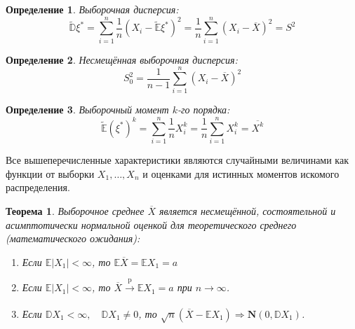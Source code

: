 \documentclass[oneside,final,14pt]{extreport}
\newtheorem{thm}{Теорема}[section]
\theoremstyle{definition}
\newtheorem{defn}{Определение}[section]
\begin{document}
\begin{defn}
{\it Выборочная дисперсия:}
\begin{equation*}
    \tilde{\mathbb{D}} \xi^{*}=\sum_{i=1}^{n} \frac{1}{n}(X_{i}-\tilde{\mathbb{E}} \xi^{*})^{2}=\frac{1}{n} \sum_{i=1}^{n}(X_{i}-\overline{X})^{2}=S^{2}
\end{equation*}
\end{defn}

\begin{defn}
{\it Несмещённая выборочная дисперсия:} 
\begin{equation*}
    S_{0}^{2}=\frac{1}{n-1} \sum_{i=1}^{n}\left(X_{i}-\overline{X}\right)^{2}
\end{equation*}
\end{defn}

\begin{defn}
{\it Выборочный момент $k$-го порядка:}
\begin{equation*}
    \tilde{\mathbb{E}}(\xi^{*})^{k}=\sum_{i=1}^{n} \frac{1}{n} X_{i}^{k}=\frac{1}{n} \sum_{i=1}^{n} X_{i}^{k}=\overline{X^{k}}
\end{equation*}
\end{defn}

Все вышеперечисленные характеристики являются случайными величинами как функции от выборки $X_{1}, \ldots, X_{n}$ и оценками для истинных моментов искомого распределения.

\begin{thm}
Выборочное среднее $\overline{X}$ является несмещённой, состоятельной и асимптотически нормальной оценкой для теоретического среднего (математического ожидания):

\begin{enumerate}[label={\arabic*.}]
    \item Если $\mathbb{E}|X_{1}|<\infty$, то $\mathbb{E}\overline{X}=\mathbb{E} X_{1}=a$
    \item Если $\mathbb{E}|X_{1}|<\infty$, то $\overline{X} \xrightarrow[]{\mathrm{p}} \mathbb{E} X_{1}=a$ при $n \rightarrow \infty$.
    \item Если $\mathbb{D} X_{1}<\infty, \quad \mathbb{D} X_{1} \neq 0$, то $\sqrt{n}(\overline{X}-\mathbb{E} X_{1}) \Rightarrow \mathbf{N}(0, \mathbb{D} X_{1})$.
\end{enumerate}
\end{thm}
\end{document}
